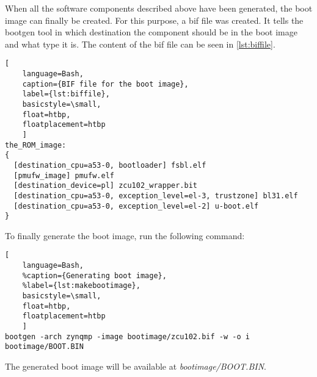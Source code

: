 When all the software components described above have been generated, the boot image can finally be created. For this purpose, a \gls{bif} file was created. It tells the bootgen tool in which destination the component should be in the boot image and what type it is. The content of the \gls{bif} file can be seen in \cref{lst:biffile}.
\begin{lstlisting}[
	language=Bash,
	caption={BIF file for the boot image},
	label={lst:biffile},
	basicstyle=\small,
	float=htbp,
	floatplacement=htbp
	]
the_ROM_image:
{
  [destination_cpu=a53-0, bootloader] fsbl.elf
  [pmufw_image] pmufw.elf
  [destination_device=pl] zcu102_wrapper.bit
  [destination_cpu=a53-0, exception_level=el-3, trustzone] bl31.elf
  [destination_cpu=a53-0, exception_level=el-2] u-boot.elf
}
\end{lstlisting}

To finally generate the boot image, run the following command:
\begin{lstlisting}[
	language=Bash,
	%caption={Generating boot image},
	%label={lst:makebootimage},
	basicstyle=\small,
	float=htbp,
	floatplacement=htbp
	]
bootgen -arch zynqmp -image bootimage/zcu102.bif -w -o i bootimage/BOOT.BIN
\end{lstlisting}

The generated boot image will be available at \emph{bootimage/BOOT.BIN}.